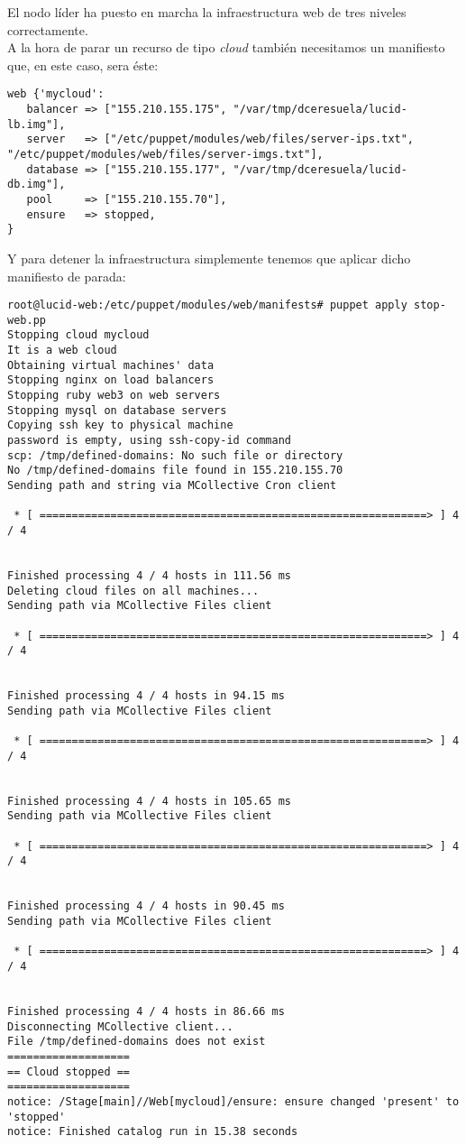 El nodo líder ha puesto en marcha la infraestructura web de tres niveles correctamente. \\

A la hora de parar un recurso de tipo \emph{cloud} también necesitamos un manifiesto que, en este caso, sera éste:
\begin{lstlisting}
web {'mycloud':
   balancer => ["155.210.155.175", "/var/tmp/dceresuela/lucid-lb.img"],
   server   => ["/etc/puppet/modules/web/files/server-ips.txt", "/etc/puppet/modules/web/files/server-imgs.txt"],
   database => ["155.210.155.177", "/var/tmp/dceresuela/lucid-db.img"],
   pool     => ["155.210.155.70"],
   ensure   => stopped,
}
\end{lstlisting}

Y para detener la infraestructura simplemente tenemos que aplicar dicho manifiesto de parada:

\begin{lstlisting}
root@lucid-web:/etc/puppet/modules/web/manifests# puppet apply stop-web.pp 
Stopping cloud mycloud
It is a web cloud
Obtaining virtual machines' data
Stopping nginx on load balancers
Stopping ruby web3 on web servers
Stopping mysql on database servers
Copying ssh key to physical machine
password is empty, using ssh-copy-id command
scp: /tmp/defined-domains: No such file or directory
No /tmp/defined-domains file found in 155.210.155.70
Sending path and string via MCollective Cron client

 * [ ============================================================> ] 4 / 4


Finished processing 4 / 4 hosts in 111.56 ms
Deleting cloud files on all machines...
Sending path via MCollective Files client

 * [ ============================================================> ] 4 / 4


Finished processing 4 / 4 hosts in 94.15 ms
Sending path via MCollective Files client

 * [ ============================================================> ] 4 / 4


Finished processing 4 / 4 hosts in 105.65 ms
Sending path via MCollective Files client

 * [ ============================================================> ] 4 / 4


Finished processing 4 / 4 hosts in 90.45 ms
Sending path via MCollective Files client

 * [ ============================================================> ] 4 / 4


Finished processing 4 / 4 hosts in 86.66 ms
Disconnecting MCollective client...
File /tmp/defined-domains does not exist
===================
== Cloud stopped ==
===================
notice: /Stage[main]//Web[mycloud]/ensure: ensure changed 'present' to 'stopped'
notice: Finished catalog run in 15.38 seconds
\end{lstlisting}
